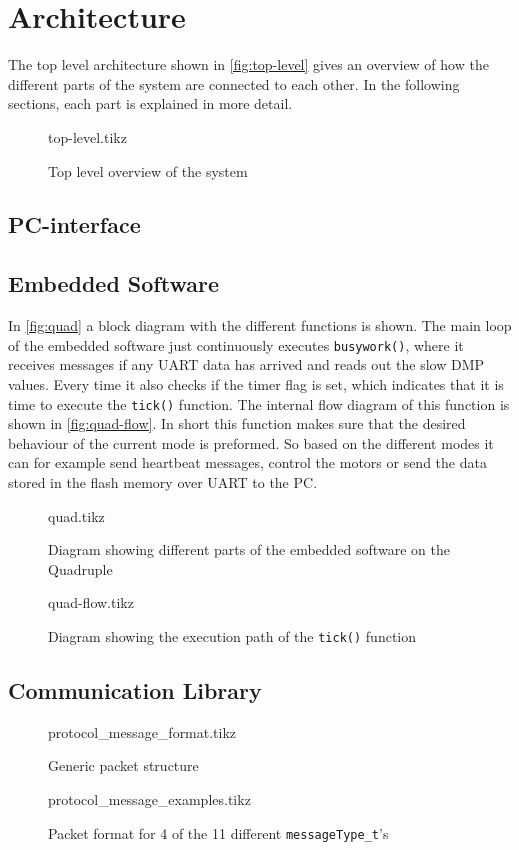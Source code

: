 \documentclass[final]{article}
\begin{document}
\section{Architecture}
The top level architecture shown in \autoref{fig:top-level} gives an overview of how the different parts of the system are connected to each other. In the following sections, each part is explained in more detail.

\begin{figure}[H]
\centering
    {top-level.tikz}
    \caption{Top level overview of the system}
    \label{fig:top-level}
\end{figure}

\subsection{PC-interface}

\subsection{Embedded Software}
In \autoref{fig:quad} a block diagram with the different functions is shown.
The main loop of the embedded software just continuously executes \texttt{busywork()}, where it receives messages if any UART data has arrived and reads out the slow DMP values.
Every time it also checks if the timer flag is set, which indicates that it is time to execute the \texttt{tick()} function.
The internal flow diagram of this function is shown in \autoref{fig:quad-flow}.
In short this function makes sure that the desired behaviour of the current mode is preformed.
So based on the different modes it can for example send heartbeat messages, control the motors or send the data stored in the flash memory over UART to the PC.

\begin{figure}[H]
\centering
    {quad.tikz}
    \caption{Diagram showing different parts of the embedded software on the Quadruple}
    \label{fig:quad}
\end{figure}

\begin{figure}[H]
\centering
    {quad-flow.tikz}
    \caption{Diagram showing the execution path of the \texttt{tick()} function}
    \label{fig:quad-flow}
\end{figure}


\subsection{Communication Library}

\begin{figure}[H]
\centering
    {protocol_message_format.tikz}
    \caption{Generic packet structure}
    \label{fig:packet_format}
\end{figure}
\begin{figure}[H]
\centering
    {protocol_message_examples.tikz}
    \caption{Packet format for 4 of the 11 different \texttt{messageType\_t}'s}
    \label{fig:packet_example}
\end{figure}
\end{document}
